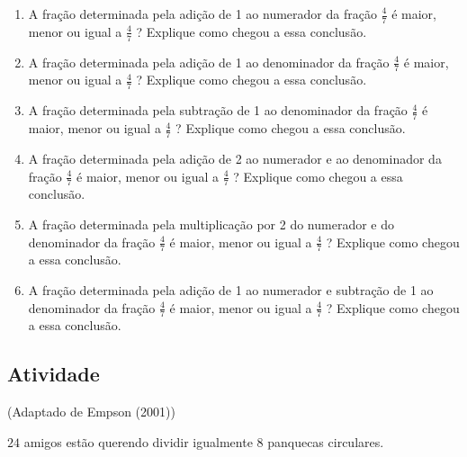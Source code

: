 \documentclass[a4,12pt]{book}
\begin{document}
\begin{enumerate} [\quad I)] %
  \item     A fração determinada pela adição de 1 ao numerador da fração     $\frac{4}{7}$     é maior, menor ou igual a     $\frac{4}{7}$    ? Explique como chegou a essa conclusão.
  \item     A fração determinada pela adição de 1 ao denominador da fração     $\frac{4}{7}$     é maior, menor ou igual a     $\frac{4}{7}$    ? Explique como chegou a essa conclusão.
  \item     A fração determinada pela subtração de 1 ao denominador da fração     $\frac{4}{7}$     é maior, menor ou igual a     $\frac{4}{7}$    ? Explique como chegou a essa conclusão.
  \item     A fração determinada pela adição de 2 ao numerador e ao denominador da fração     $\frac{4}{7}$     é maior, menor ou igual a     $\frac{4}{7}$    ? Explique como chegou a essa conclusão.
  \item     A fração determinada pela multiplicação por 2 do numerador e do denominador da fração     $\frac{4}{7}$     é maior, menor ou igual a     $\frac{4}{7}$    ? Explique como chegou a essa conclusão.
  \item     A fração determinada pela adição de 1 ao numerador e subtração de 1 ao denominador da fração     $\frac{4}{7}$     é maior, menor ou igual a     $\frac{4}{7}$    ? Explique como chegou a essa conclusão.
\end{enumerate} %









\subsection{Atividade}







(Adaptado de Empson (2001))

$24$ amigos estão querendo dividir igualmente $8$ panquecas circulares.
\end{document}
